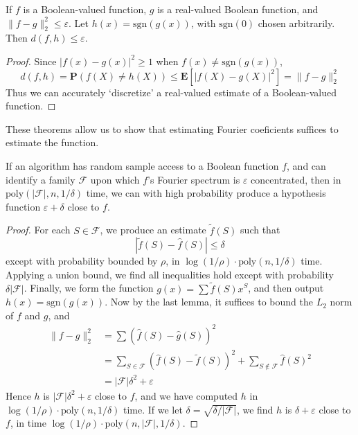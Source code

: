 \begin{theorem}
    If $f$ is a Boolean-valued function, $g$ is a real-valued Boolean function, and $\| f - g \|_2^2 \leq \varepsilon$. Let $h(x) = \text{sgn}(g(x))$, with $\text{sgn}(0)$ chosen arbitrarily. Then $d(f,h) \leq \varepsilon$.
\end{theorem}
\begin{proof}
    Since $|f(x) - g(x)|^2 \geq 1$ when $f(x) \neq \text{sgn}(g(x))$,
    \[ d(f,h) = \mathbf{P}(f(X) \neq h(X)) \leq \mathbf{E}[|f(X) - g(X)|^2] = \| f - g \|_2^2 \]
    Thus we can accurately `discretize' a real-valued estimate of a Boolean-valued function.
\end{proof}

These theorems allow us to show that estimating Fourier coeficients suffices to estimate the function.

\begin{theorem}
    If an algorithm has random sample access to a Boolean function $f$, and can identify a family $\mathcal{F}$ upon which $f$'s Fourier spectrum is $\varepsilon$ concentrated, then in $\text{poly}(|\mathcal{F}|, n, 1/\delta)$ time, we can with high probability produce a hypothesis function $\varepsilon + \delta$ close to $f$.
\end{theorem}
\begin{proof}
    For each $S \in \mathcal{F}$, we produce an estimate $\widetilde{f}(S)$ such that
    \[ |\widetilde{f}(S) - \widehat{f}(S)| \leq \delta \]
    except with probability bounded by $\rho$, in $\log(1/\rho) \cdot \text{poly}(n,1/\delta)$ time. Applying a union bound, we find all inequalities hold except with probability $\delta |\mathcal{F}|$. Finally, we form the function $g(x) = \sum \tilde{f}(S) x^S$, and then output $h(x) = \text{sgn}(g(x))$. Now by the last lemma, it suffices to bound the $L_2$ norm of $f$ and $g$, and
    \begin{align*}
        \| f - g \|_2^2 &= \sum \left( \widehat{f}(S) - \widehat{g}(S) \right)^2\\
        &= \sum_{S \in \mathcal{F}} \left( \widehat{f}(S) - \tilde{f}(S) \right)^2 + \sum_{S \not \in \mathcal{F}} \widehat{f}(S)^2\\
        &= |\mathcal{F}| \delta^2 + \varepsilon
    \end{align*}
    Hence $h$ is $|\mathcal{F}| \delta^2 + \varepsilon$ close to $f$, and we have computed $h$ in $\log(1/\rho) \cdot \text{poly}(n,1/\delta)$ time. If we let $\delta = \sqrt{\delta/|\mathcal{F}|}$, we find $h$ is $\delta + \varepsilon$ close to $f$, in time $\log(1/\rho) \cdot \text{poly}(n,|\mathcal{F}|, 1/\delta)$.
\end{proof}

